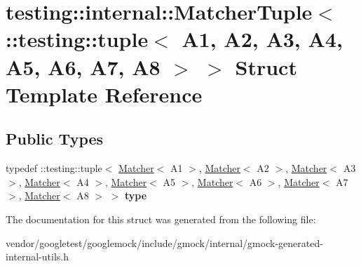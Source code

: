 \hypertarget{structtesting_1_1internal_1_1_matcher_tuple_3_01_1_1testing_1_1tuple_3_01_a1_00_01_a2_00_01_a3_0d8930d50f28e62c202d0bf6b34d01eac}{}\section{testing\+:\+:internal\+:\+:Matcher\+Tuple$<$ \+:\+:testing\+:\+:tuple$<$ A1, A2, A3, A4, A5, A6, A7, A8 $>$ $>$ Struct Template Reference}
\label{structtesting_1_1internal_1_1_matcher_tuple_3_01_1_1testing_1_1tuple_3_01_a1_00_01_a2_00_01_a3_0d8930d50f28e62c202d0bf6b34d01eac}
\subsection*{Public Types}
\begin{DoxyCompactItemize}
\item 
\mbox{\label{structtesting_1_1internal_1_1_matcher_tuple_3_01_1_1testing_1_1tuple_3_01_a1_00_01_a2_00_01_a3_0d8930d50f28e62c202d0bf6b34d01eac_a17186b5ae808ec16b84eb4022ab7a089}} 
typedef \+::testing\+::tuple$<$ \mbox{\hyperlink{classtesting_1_1_matcher}{Matcher}}$<$ A1 $>$, \mbox{\hyperlink{classtesting_1_1_matcher}{Matcher}}$<$ A2 $>$, \mbox{\hyperlink{classtesting_1_1_matcher}{Matcher}}$<$ A3 $>$, \mbox{\hyperlink{classtesting_1_1_matcher}{Matcher}}$<$ A4 $>$, \mbox{\hyperlink{classtesting_1_1_matcher}{Matcher}}$<$ A5 $>$, \mbox{\hyperlink{classtesting_1_1_matcher}{Matcher}}$<$ A6 $>$, \mbox{\hyperlink{classtesting_1_1_matcher}{Matcher}}$<$ A7 $>$, \mbox{\hyperlink{classtesting_1_1_matcher}{Matcher}}$<$ A8 $>$ $>$ {\bfseries type}
\end{DoxyCompactItemize}


The documentation for this struct was generated from the following file\+:\begin{DoxyCompactItemize}
\item 
vendor/googletest/googlemock/include/gmock/internal/gmock-\/generated-\/internal-\/utils.\+h\end{DoxyCompactItemize}
